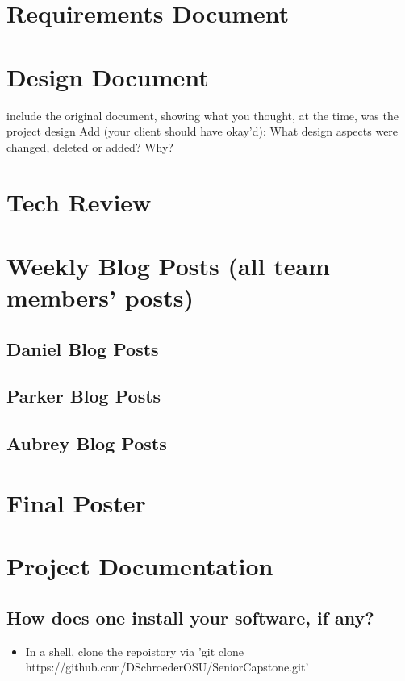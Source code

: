 \documentclass[journal,10pt,onecolumn,compsoc]{IEEEtran}
\begin{document}
    \section{Requirements Document}
    
    
    \section{Design Document}
    
    include the original document, showing what you thought, at the time, was the project design
    Add (your client should have okay'd): What design aspects were changed, deleted or added? Why? 
    \section{Tech Review}
    
	
	
    \section{Weekly Blog Posts (all team members' posts)}
    \subsection{Daniel Blog Posts}
    
	\subsection{Parker Blog Posts}
	
	\subsection{Aubrey Blog Posts}
	
    \section{Final Poster}
    \section{Project Documentation}
    \subsection{How does one install your software, if any?}
    \begin{itemize}
        \item In a shell, clone the repoistory via 'git clone https://github.com/DSchroederOSU/SeniorCapstone.git'
    \end{itemize}
\end{document}
